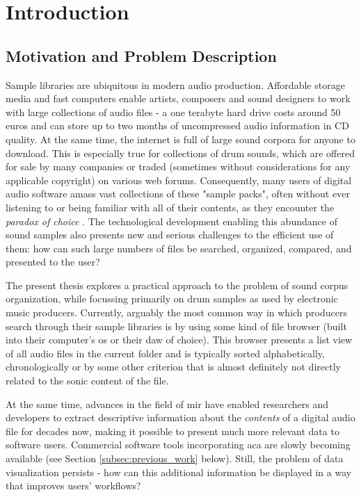 
\section{Introduction}
\label{sec:introduction}

\subsection{Motivation and Problem Description}
\label{subsec:motivation}
Sample libraries are ubiquitous in modern audio production. Affordable storage
media and fast computers enable artists, composers and sound designers to work
with large collections of audio files - a one terabyte hard drive costs around
50 euros and can store up to two months of uncompressed audio information in CD
quality. At the same time, the internet is full of large sound corpora for
anyone to download. This is especially true for collections of drum sounds,
which are offered for sale by many companies or traded (sometimes without
considerations for any applicable copyright) on various web forums.
Consequently, many users of digital audio software amass vast collections of
these "sample packs", often without ever listening to or being familiar with
all of their contents, as they encounter the \textit{paradox of choice}
\citep{schwartz2004}. The technological development enabling this abundance of
sound samples also presents new and serious challenges to the efficient use of
them: how can such large numbers of files be searched, organized, compared, and
presented to the user?

\bigskip

The present thesis explores a practical approach to the problem of sound corpus
organization, while focussing primarily on drum samples as used by electronic
music producers.
Currently, arguably the most common way in which producers
search through their sample libraries is by using some kind of file browser
(built into their computer's \gls{os} or their \gls{daw} of choice). This
browser presents a list view of all audio files in the current folder and is
typically sorted alphabetically, chronologically or by some other criterion that
is almost definitely not directly related to the sonic content of the file.

\smallskip

At the same time, advances in the field of \gls{mir} have enabled researchers
and developers to extract descriptive information about the \textit{contents}
of a digital audio file for decades now, making it possible to present much
more relevant data to software users. Commercial software tools incorporating
\gls{aca} are slowly becoming available (see Section \ref{subsec:previous_work}
below). Still, the problem of data visualization persists - how can this
additional information be displayed in a way that improves users' workflows?


